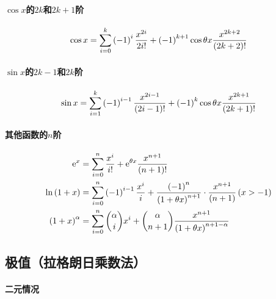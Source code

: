 \documentclass{article}
\begin{document}
\paragraph{$\cos x$的$2k$和$2k+1$阶}

\[\cos x=\sum_{i=0}^k\left(-1\right)^i\frac{x^{2i}}{2i!}+\left(-1\right)^{k+1}\cos\theta x\frac{x^{2k+2}}{\left(2k+2\right)!}\]

\paragraph{$\sin x$的$2k-1$和$2k$阶}

\[\sin x=\sum_{i=1}^k\left(-1\right)^{i-1}\frac{x^{2i-1}}{\left(2i-1\right)!}+\left(-1\right)^k\cos\theta x\frac{x^{2k+1}}{\left(2k+1\right)!}\]

\paragraph{其他函数的$n$阶}

\[\begin{aligned}
        \mathrm e^x           & =\sum_{i=0}^n\frac{x^i}{i!}+\mathrm e^{\theta x}\frac{x^{n+1}}{\left(n+1\right)!}                                                \\
        \ln\left(1+x\right)     & =\sum_{i=0}^n\left(-1\right)^{i-1}\frac{x^i}{i}+\frac{\left(-1\right)^n}{\left(1+\theta x\right)^{n+1}}\cdot\frac{x^{n+1}}{\left(n+1\right)}\left(x>-1\right) \\
        \left(1+x\right)^\alpha & =\sum_{i=0}^n\binom \alpha ix^i+\binom \alpha{n+1}\frac{x^{n+1}}{\left(1+\theta x\right)^{n+1-\alpha}}
    \end{aligned}\]

\subsection{极值（拉格朗日乘数法）}

\paragraph{二元情况}
\end{document}
